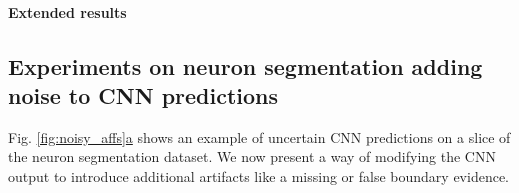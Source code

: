 \paragraph{Extended results} 

\subsection{Experiments on neuron segmentation adding noise to CNN predictions} \label{sec:appendix_noise_gen}



Fig. \hyperref[fig:noisy_affs]{\ref*{fig:noisy_affs}a} shows an example of uncertain CNN predictions on a slice of the neuron segmentation dataset. We now present a way of modifying the CNN output to introduce additional artifacts like a missing or false boundary evidence. 

